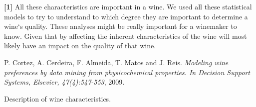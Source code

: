 \documentclass[11pt]{article}
\begin{document}
{\color{red}\textbf{[1]}} All these characteristics are important in a wine.
We used all these statistical models to try to understand to which degree they are important
to determine a wine`s quality.
These analyses might be really important for a winemaker to know.
Given that by affecting the inherent characteristics of the wine will most likely have an
impact on the quality of that wine.


\begin{thebibliography}{1}
 P. Cortez, A. Cerdeira, F. Almeida, T. Matos and J. Reis. {\em Modeling wine preferences by data mining from physicochemical properties.
In Decision Support Systems, Elsevier, 47(4):547-553},  2009.
\end{thebibliography}


\begin{table}
    \centering
    \caption{Description of wine characteristics.}
    \resizebox{\columnwidth}{!}{
    
    }
    \label{tab:description_wine}
\end{table}
\end{document}
